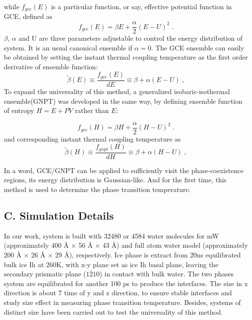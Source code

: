 \documentclass[aps,prl,twocolumn,superscriptaddress]{revtex4-1}
\begin{document}
while $f_{gce}(E)$ is a particular function, or say, effective potential function in GCE, defined as
\begin{equation}
f_{gce}(E)=\beta E+ \frac{\alpha}{2}(E−U)^2\;.
\end{equation}
$\beta$, $\alpha$ and U are three parameters adjustable to control the energy distribution of system. It is an usual canonical ensemble if $\alpha=0$. The GCE ensemble can easily be obtained by setting the instant thermal coupling temperature as the first order derivative of ensemble function:
\begin{equation}
\widetilde{\beta}(E)≡\frac{f_{gce}(E)}{dE}≡\beta+α(E−U)\;,
\end{equation}
To expand the universality of this method, a generalized isobaric-isothermal ensemble(GNPT) was developed in the same way, by defining ensemble function of entropy $H=E+PV$ rather than $E$:

\begin{equation}
f_{gce}(H)=\beta H+ \frac{\alpha}{2}(H−U)^2\;.
\end{equation}
and corresponding instant thermal coupling temperature as
\begin{equation}
\widetilde{\beta}(H)≡\frac{f_{gnpt}(H)}{dH}≡\beta+α(H−U)\;,
\end{equation}

In a word,  GCE/GNPT can be applied to sufficiently visit the phase-coexistence regions, its energy distribution is Gaussian-like\cite{Xu2012,Xu2015}. And for the first time, this method is used to determine the phase transition temperature.

\subsection{C. Simulation Details}
In our work, system is built with 32480 or 4584 water molecules for mW (approximately 400 Å × 56 Å × 43 Å) and full atom water model (approximately 200 Å × 26 Å × 29 Å), respectively. Ice phase is extract from 20ns equilibrated bulk ice Ih at 260K, with x-y plane set as ice Ih basal plane, leaving the secondary prismatic plane ($1\overline{2}10$) in contact with bulk water. The two phases system are equilibrated for another 100 ps to produce the interfaces. The size in x direction is about 7 time of y and z direction, to ensure stable interfaces and study size effect in measuring phase transition temperature. Besides, systems of distinct size have been carried out to test the universality of this method.
\end{document}
